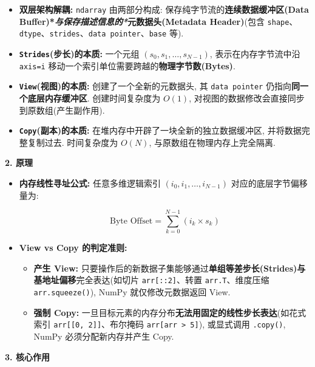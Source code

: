 \documentclass[11pt]{article}
\providecommand{\tightlist}{%
      \setlength{\itemsep}{0pt}\setlength{\parskip}{0pt}}
\begin{document}
\begin{itemize}
\tightlist
\item
  \textbf{双层架构解耦:} \texttt{ndarray} 由两部分构成:
  保存纯字节流的\textbf{连续数据缓冲区(Data
  Buffer)*\emph{与保存描述信息的*}元数据头(Metadata Header)}(包含
  \texttt{shape}、\texttt{dtype}、\texttt{strides}、\texttt{data\ pointer}、\texttt{base}
  等).
\item
  \textbf{\texttt{Strides}(步长)的本质:} 一个元组
  \((s_0, s_1, \dots, s_{N-1})\), 表示在内存字节流中沿 \texttt{axis=i}
  移动一个索引单位需要跨越的\textbf{物理字节数(Bytes)}.
\item
  \textbf{\texttt{View}(视图)的本质:} 创建了一个全新的元数据头, 其
  \texttt{data\ pointer} 仍指向\textbf{同一个底层内存缓冲区}.
  创建时间复杂度为 \(O(1)\),
  对视图的数据修改会直接同步到原数组(产生副作用).
\item
  \textbf{\texttt{Copy}(副本)的本质:}
  在堆内存中开辟了一块全新的独立数据缓冲区, 并将数据完整复制过去.
  时间复杂度为 \(O(N)\), 与原数组在物理内存上完全隔离.
\end{itemize}

\textbf{2. 原理}

\begin{itemize}
\item
  \textbf{内存线性寻址公式:} 任意多维逻辑索引
  \((i_0, i_1, \dots, i_{N-1})\) 对应的底层字节偏移量为:

  \[\text{Byte Offset} = \sum_{k=0}^{N-1} (i_k \times s_k)\]
\item
  \textbf{View vs Copy 的判定准则:}

  \begin{itemize}
  \tightlist
  \item
    \textbf{产生 View:}
    只要操作后的新数据子集能够通过\textbf{单组等差步长(Strides)与基地址偏移}完全表达(如切片
    \texttt{arr{[}::2{]}}、转置 \texttt{arr.T}、维度压缩
    \texttt{arr.squeeze()}), NumPy 就仅修改元数据返回 View.
  \item
    \textbf{强制 Copy:}
    一旦目标元素的内存分布\textbf{无法用固定的线性步长表达}(如花式索引
    \texttt{arr{[}{[}0,\ 2{]}{]}}、布尔掩码
    \texttt{arr{[}arr\ \textgreater{}\ 5{]}}), 或显式调用
    \texttt{.copy()}, NumPy 必须分配新内存并产生 Copy.
  \end{itemize}
\end{itemize}

\textbf{3. 核心作用}
\end{document}
